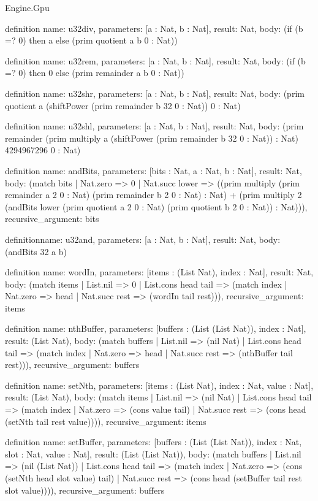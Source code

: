 \begin{lexlean}{Engine.Gpu}
\begin{semanticmodule}
definition{
  name: u32div,
  parameters: [a : Nat, b : Nat],
  result: Nat,
  body: (if (b =? 0) then a else (prim quotient a b 0 : Nat))
}

definition{
  name: u32rem,
  parameters: [a : Nat, b : Nat],
  result: Nat,
  body: (if (b =? 0) then 0 else (prim remainder a b 0 : Nat))
}

definition{
  name: u32shr,
  parameters: [a : Nat, b : Nat],
  result: Nat,
  body: (prim quotient a (shiftPower (prim remainder b 32 0 : Nat)) 0 : Nat)
}

definition{
  name: u32shl,
  parameters: [a : Nat, b : Nat],
  result: Nat,
  body: (prim remainder (prim multiply a (shiftPower (prim remainder b 32 0 : Nat)) : Nat) 4294967296 0 : Nat)
}

definition{
  name: andBits,
  parameters: [bits : Nat, a : Nat, b : Nat],
  result: Nat,
  body: (match bits
    | Nat.zero => 0
    | Nat.succ lower => ((prim multiply (prim remainder a 2 0 : Nat) (prim remainder b 2 0 : Nat) : Nat) + (prim multiply 2 (andBits lower (prim quotient a 2 0 : Nat) (prim quotient b 2 0 : Nat)) : Nat))),
  recursive_argument: bits
}

definition{name: u32and, parameters: [a : Nat, b : Nat], result: Nat, body: (andBits 32 a b)}

definition{
  name: wordIn,
  parameters: [items : (List Nat), index : Nat],
  result: Nat,
  body: (match items
    | List.nil => 0
    | List.cons head tail => (match index
      | Nat.zero => head
      | Nat.succ rest => (wordIn tail rest))),
  recursive_argument: items
}

definition{
  name: nthBuffer,
  parameters: [buffers : (List (List Nat)), index : Nat],
  result: (List Nat),
  body: (match buffers
    | List.nil => (nil Nat)
    | List.cons head tail => (match index
      | Nat.zero => head
      | Nat.succ rest => (nthBuffer tail rest))),
  recursive_argument: buffers
}

definition{
  name: setNth,
  parameters: [items : (List Nat), index : Nat, value : Nat],
  result: (List Nat),
  body: (match items
    | List.nil => (nil Nat)
    | List.cons head tail => (match index
      | Nat.zero => (cons value tail)
      | Nat.succ rest => (cons head (setNth tail rest value)))),
  recursive_argument: items
}

definition{
  name: setBuffer,
  parameters: [buffers : (List (List Nat)), index : Nat, slot : Nat, value : Nat],
  result: (List (List Nat)),
  body: (match buffers
    | List.nil => (nil (List Nat))
    | List.cons head tail => (match index
      | Nat.zero => (cons (setNth head slot value) tail)
      | Nat.succ rest => (cons head (setBuffer tail rest slot value)))),
  recursive_argument: buffers
}


\end{semanticmodule}
\end{lexlean}
